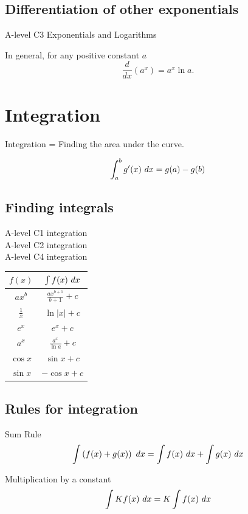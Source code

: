 \documentclass[11pt,a4paper,oneside]{book}
\begin{document}
\section{Differentiation of other exponentials}
\begin{gce}
A-level C3 Exponentials and Logarithms
\end{gce}
\begin{in_a_box}
In general, for any positive constant $a$
\[\frac{d}{dx}(a^x)=a^x\ln a.\]
\end{in_a_box}

\chapter{Integration}
Integration = Finding the area under the curve.

\begin{theorem}
\[\int_a^b g'(x) \ dx = g(a)-g(b)\]
\end{theorem}

\section{Finding integrals}
\begin{gce}
A-level C1 integration\\
A-level C2 integration\\
A-level C4 integration
\end{gce}
\begin{tabular}{|c|c|}
\hline
$f(x)$&$\int f(x)\ dx$\\\hline
$ax^b$&$\frac{ax^{b+1}}{b+1}+c$\\
$\frac{1}{x}$&$\ln |x|+c$\\
$e^x$&$e^x+c$\\
$a^x$&$\frac{a^x}{\ln a}+c$\\
$\cos x$&$\sin x + c$\\
$\sin x$&$-\cos x + c$\\
\hline
\end{tabular}

\section{Rules for integration}
\begin{thing}{Sum Rule}
\begin{equation}
\int \left( f(x)+g(x) \right)\ dx=\int f(x)\ dx+ \int g(x)\ dx
\end{equation}
\end{thing}
\begin{thing}{Multiplication by a constant}
\begin{equation}
\int K f(x)\ dx=K\int f(x)\ dx
\end{equation}
\end{thing}
\end{document}

